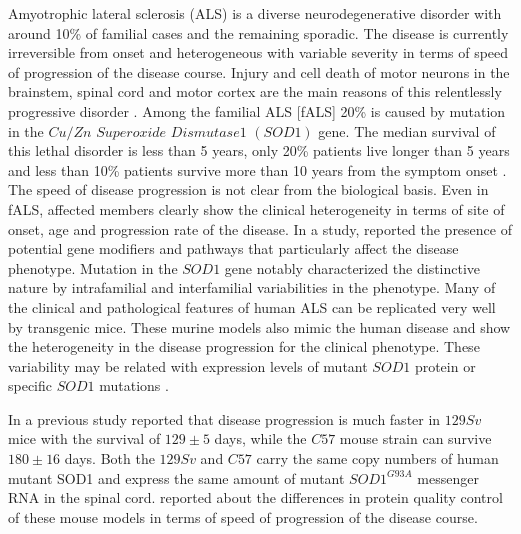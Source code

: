 Amyotrophic lateral sclerosis (ALS) is a diverse neurodegenerative disorder with around 10\% of familial cases and the remaining sporadic. The disease is currently irreversible from onset and heterogeneous with variable severity in terms of speed of progression of the disease course. Injury and cell death of motor neurons in the brainstem, spinal cord and motor cortex are the main reasons of this relentlessly progressive disorder \cite{Brockington:2013, Ferraiuolo:2011, Haverkamp:1995, Peviani:2010}. Among the familial ALS [fALS] 20\% is caused by mutation in the $Cu/Zn$ $Superoxide$ $Dismutase 1$ $(SOD1)$ gene. The median survival of this lethal disorder is less than 5 years, only 20\% patients live longer than 5 years and less than 10\% patients survive more than 10 years from the symptom onset \cite{Beghi:2011, Saccon:2013}. The speed of disease progression is not clear from the biological basis. Even in fALS, affected members clearly show the clinical heterogeneity in terms of site of onset, age and progression rate of the disease. In a study, \cite{Camu:1999} reported the presence of potential gene modifiers and pathways that particularly affect the disease phenotype. Mutation in the $SOD1$ gene notably characterized the distinctive nature by intrafamilial and interfamilial variabilities in the phenotype. Many of the clinical and pathological features of human ALS can be replicated very well by transgenic mice. These murine models also mimic the human disease and show the heterogeneity in the disease progression for the clinical phenotype. These variability may be related with expression levels of mutant $SOD1$ protein or specific $SOD1$ mutations \cite{Turner:2008}.

In a previous study \cite{Pizzasegola:2009} reported that disease progression is much faster in $129Sv$ mice with the survival of $129\pm5$ days, while the $C57$ mouse strain can survive $180\pm16$ days. Both the $129Sv$ and $C57$ carry the same copy numbers of human mutant SOD1 and express the same amount of mutant $SOD1^{G93A}$ messenger RNA in the spinal cord.  \cite{Marino:2015} reported about the differences in protein quality control of these mouse models in terms of speed of progression of the disease course.

